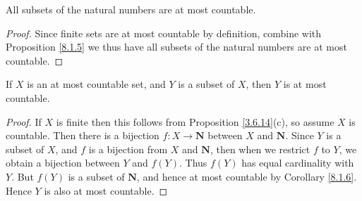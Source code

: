 \begin{corollary}\label{8.1.6}
All subsets of the natural numbers are at most countable.
\end{corollary}

\begin{proof}
Since finite sets are at most countable by definition, combine with Proposition \ref{8.1.5} we thus have all subsets of the natural numbers are at most countable.
\end{proof}

\begin{corollary}\label{8.1.7}
If \(X\) is an at most countable set, and \(Y\) is a subset of \(X\), then \(Y\) is at most countable.
\end{corollary}

\begin{proof}
If \(X\) is finite then this follows from Proposition \ref{3.6.14}(c), so assume \(X\) is countable.
Then there is a bijection \(f : X \to \mathbf{N}\) between \(X\) and \(\mathbf{N}\).
Since \(Y\) is a subset of \(X\), and \(f\) is a bijection from \(X\) and \(\mathbf{N}\), then when we restrict \(f\) to \(Y\), we obtain a bijection between \(Y\) and \(f(Y)\).
Thus \(f(Y)\) has equal cardinality with \(Y\).
But \(f(Y)\) is a subset of \(\mathbf{N}\), and hence at most countable by Corollary \ref{8.1.6}.
Hence \(Y\) is also at most countable.
\end{proof}